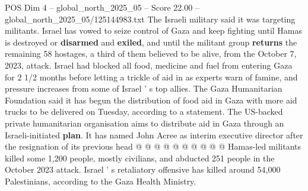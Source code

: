 \begin{textsample}{POS Dim 4 – global\_north\_2025\_05 – Score 22.00 – global\_north\_2025\_05/125144983.txt}
The Israeli military said it was targeting militants.
Israel has vowed to seize control of Gaza and keep fighting until Hamas is destroyed or \textbf{disarmed} and \textbf{exiled}, and until the militant group \textbf{returns} the remaining 58 hostages, a third of them believed to be alive, from the October 7, 2023, attack.
Israel had blocked all food, medicine and fuel from entering Gaza for 2 1/2 months before letting a trickle of aid in as experts warn of famine, and pressure increases from some of Israel ' s top allies.
The Gaza Humanitarian Foundation said it has begun the distribution of food aid in Gaza with more aid trucks to be delivered on Tuesday, according to a statement.
The US-backed private humanitarian organisation aims to distribute aid in Gaza through an Israeli-initiated \textbf{plan}.
It has named John Acree as interim executive director after the resignation of its previous head @ @ @ @ @ @ @ @ @ @ Hamas-led militants killed some 1,200 people, mostly civilians, and abducted 251 people in the October 2023 attack.
Israel ' s retaliatory offensive has killed around 54,000 Palestinians, according to the Gaza Health Ministry.

\end{textsample}
